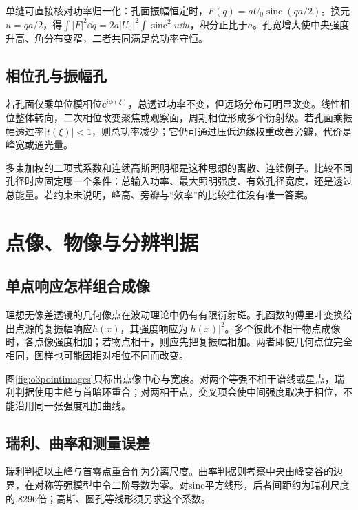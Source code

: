 单缝可直接核对功率归一化：孔面振幅恒定时，$F(q)=aU_0\operatorname{sinc}(qa/2)$。换元$u=qa/2$，得$\int|F|^2\dd q=2a|U_0|^2\int\operatorname{sinc}^2u\dd u$，积分正比于$a$。孔宽增大使中央强度升高、角分布变窄，二者共同满足总功率守恒。

\subsection{相位孔与振幅孔}
若孔面仅乘单位模相位$\ee^{i\phi(\xi)}$，总透过功率不变，但远场分布可明显改变。线性相位整体转向，二次相位改变聚焦或观察面，周期相位形成多个衍射级。若孔面乘振幅透过率$|t(\xi)|<1$，则总功率减少；它仍可通过压低边缘权重改善旁瓣，代价是峰宽或通光量。

多束加权的二项式系数和连续高斯照明都是这种思想的离散、连续例子。比较不同孔径时应固定哪一个条件：总输入功率、最大照明强度、有效孔径宽度，还是透过总能量。若约束未说明，峰高、旁瓣与“效率”的比较往往没有唯一答案。

\section{点像、物像与分辨判据}
\subsection{单点响应怎样组合成像}
理想无像差透镜的几何像点在波动理论中仍有有限衍射斑。孔函数的傅里叶变换给出点源的复振幅响应$h(x)$，其强度响应为$|h(x)|^2$。多个彼此不相干物点成像时，各点像强度相加；若物点相干，则应先把复振幅相加。两者即使几何点位完全相同，图样也可能因相对相位不同而改变。

图\ref{fig:o3pointimages}只标出点像中心与宽度。对两个等强不相干谱线或星点，瑞利判据使用主峰与首暗环重合；对两相干点，交叉项会使中间强度取决于相位，不能沿用同一张强度相加曲线。

\subsection{瑞利、曲率和测量误差}
瑞利判据以主峰与首零点重合作为分离尺度。曲率判据则考察中央由峰变谷的边界，在对称等强模型中令二阶导数为零。对sinc平方线形，后者间距约为瑞利尺度的.8296倍；高斯、圆孔等线形须另求这个系数。

